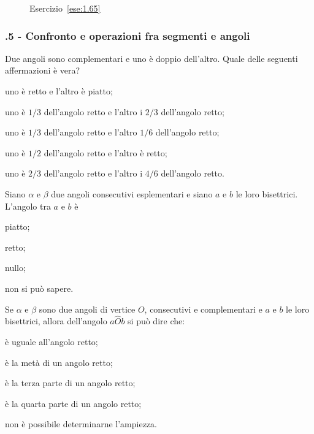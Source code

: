 \begin{figure}[htb]
 \centering
 \caption{Esercizio~\ref{ese:1.65}}\label{fig:ese1.65}
\end{figure}


\subsubsection*{\thechapter.5 - Confronto e operazioni fra segmenti e angoli}

\begin{esercizio}
\label{ese:1.66}
Due angoli sono complementari e uno è doppio dell'altro. Quale delle seguenti affermazioni è vera?
\begin{enumeratea}
\item uno è retto e l'altro è piatto;
\item uno è $1/3$ dell'angolo retto e l'altro i $2/3$ dell'angolo retto;
\item uno è $1/3$ dell'angolo retto e l'altro $1/6$ dell'angolo retto;
\item uno è $1/2$ dell'angolo retto e l'altro è retto;
\item uno è $2/3$ dell'angolo retto e l'altro i $4/6$ dell'angolo retto.
\end{enumeratea}
\end{esercizio}

\begin{esercizio}
\label{ese:1.67}
Siano $\alpha$ e $\beta$ due angoli consecutivi esplementari e siano $a$ e $b$ le loro bisettrici. L'angolo tra $a$ e $b$ è
\begin{multicols}{2}
\begin{enumeratea}
\item piatto;
\item retto;
\item nullo;
\item non si può sapere.
\end{enumeratea}
\end{multicols}
\end{esercizio}

\begin{esercizio}
\label{ese:1.68}
Se $\alpha$ e $\beta$ sono due angoli di vertice $O$, consecutivi e complementari e $a$ e $b$ le loro bisettrici, allora dell'angolo $a\widehat{O}b$ si può dire  che:
\begin{multicols}{2}
\begin{enumeratea}
\item è uguale all'angolo retto;
\item è la metà di un angolo retto;
\item è la terza parte di un angolo retto;
\item è la quarta parte di un angolo retto;
\item non è possibile determinarne l'ampiezza.
\end{enumeratea}
\end{multicols}
\end{esercizio}

